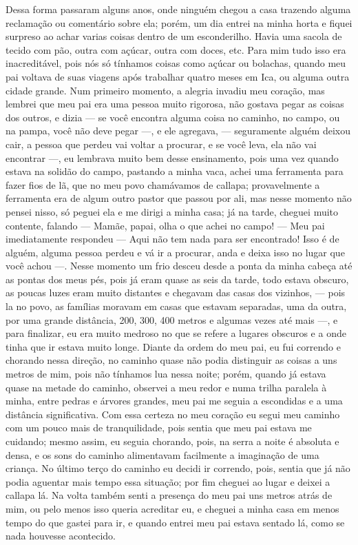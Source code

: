 Dessa forma passaram alguns anos, onde ninguém chegou a casa trazendo alguma reclamação ou comentário sobre ela; porém, um dia entrei na minha horta e  fiquei surpreso ao achar varias coisas dentro de um esconderilho. Havia uma sacola de tecido com pão, outra com açúcar, outra com doces, etc. 
Para mim tudo isso era inacreditável, pois nós só tínhamos coisas como açúcar ou bolachas, quando meu pai voltava de suas viagens após trabalhar quatro meses em Ica, ou alguma outra cidade grande.
Num primeiro momento, a alegria invadiu meu coração, mas lembrei que meu pai era uma pessoa muito rigorosa, não gostava pegar as coisas dos outros, e dizia --- se você encontra alguma coisa no caminho, no campo, ou na pampa, você não deve pegar ---, e ele agregava, --- seguramente alguém deixou cair, a pessoa que perdeu vai voltar a procurar, e se você leva, ela não vai encontrar ---, 
eu lembrava muito bem desse ensinamento, pois uma vez quando estava na solidão do campo, pastando a minha vaca, achei uma ferramenta para fazer fios de lã, que no meu povo chamávamos de callapa; provavelmente a ferramenta era de algum outro pastor que passou por ali, mas nesse momento não pensei nisso, só peguei ela e me dirigi a minha casa; já na tarde, cheguei  muito contente, falando --- Mamãe, papai, olha o que achei no campo! --- 
Meu pai imediatamente respondeu --- Aqui não tem nada para ser encontrado! Isso é de alguém, alguma pessoa perdeu e vá ir a procurar, anda e deixa isso no lugar que você achou ---. 
Nesse momento um frio desceu desde a ponta da minha cabeça até as pontas dos meus pés, pois já eram quase as seis da tarde, todo estava obscuro, as poucas luzes eram muito distantes e chegavam das casas dos vizinhos, --- pois la no povo, as famílias moravam em casas que estavam separadas, uma da outra, por uma grande distância, 200, 300, 400 metros e algumas vezes até mais  ---, e para finalizar, eu era muito medroso no que se refere a lugares obscuros e a onde tinha que ir estava muito longe.
Diante da ordem do meu pai, eu fui correndo e chorando nessa direção, no caminho quase não podia distinguir as coisas a uns metros de mim, pois não tínhamos lua nessa noite; porém, quando já estava quase na metade do caminho, observei a meu redor e numa trilha paralela à minha, entre pedras e árvores grandes, meu pai me seguia a escondidas e a uma distância significativa.
Com essa certeza no meu coração eu segui meu caminho com um pouco mais de tranquilidade, pois sentia que meu pai estava me cuidando; mesmo assim, eu seguia chorando, pois, na serra a noite é absoluta e densa, e os sons do caminho alimentavam facilmente a imaginação de uma criança.
No último terço do caminho eu decidi ir correndo, pois, sentia que já não podia aguentar mais tempo essa situação; por fim cheguei ao lugar e deixei a callapa lá.
Na volta também senti a presença do meu pai uns metros atrás de mim, ou pelo menos isso queria acreditar eu, e cheguei a minha casa em menos tempo do que gastei para ir, e quando entrei meu pai estava sentado lá, como se nada houvesse acontecido.


